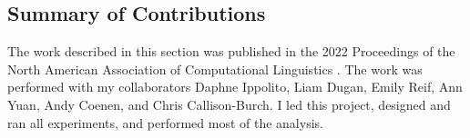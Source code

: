 
\subsection{Summary of Contributions}
The work described in this section was published in the 2022 Proceedings of the North American Association of Computational Linguistics .
The work was performed with my collaborators Daphne Ippolito, Liam Dugan, Emily Reif, Ann Yuan, Andy Coenen, and Chris Callison-Burch.
I led this project, designed and ran all experiments, and performed most of the analysis.

